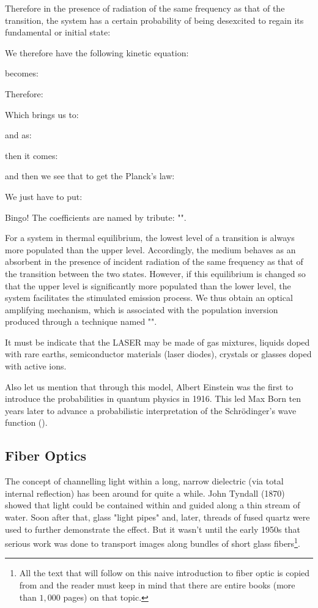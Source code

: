 	Therefore in the presence of radiation of the same frequency as that of the transition, the system has a certain probability of being desexcited to regain its fundamental or initial state:
		
	We therefore have the following kinetic equation:
	
	becomes:
	
	Therefore:
	
	Which brings us to:
	
	and as:
	
	then it comes:
	
	and then we see that to get the Planck's law:
	
	We just have to put:
	
	Bingo! The coefficients are named by tribute: "".
	
	For a system in thermal equilibrium, the lowest level of a transition is always more populated than the upper level. Accordingly, the medium behaves as an absorbent in the presence of incident radiation of the same frequency as that of the transition between the two states. However, if this equilibrium is changed so that the upper level is significantly more populated than the lower level, the system facilitates the stimulated emission process. We thus obtain an optical amplifying mechanism, which is associated with the population inversion produced through a technique named "".

	It must be indicate that the LASER may be made of gas mixtures, liquids doped with rare earths, semiconductor materials (laser diodes), crystals or glasses doped with active ions.

	Also let us mention that through this model, Albert Einstein was the first to introduce the probabilities in quantum physics in 1916. This led Max Born ten years later to advance a probabilistic interpretation of the Schrödinger's wave function ().
	
	\pagebreak
	\subsection{Fiber Optics}\label{fiber optics}
	The concept of channelling light within a long, narrow dielectric (via total internal reflection) has been around for quite a while. John Tyndall (1870) showed that light could be contained within and guided along a thin stream of water. Soon after that, glass "light pipes" and, later, threads of fused quartz were used to further demonstrate the effect. But it wasn't until the early 1950s that serious work was done to transport images along bundles of short glass fibers\footnote{All the text that will follow on this naive introduction to fiber optic is copied from \cite{hecht2016optics} and the reader must keep in mind that there are entire books (more than $1,000$ pages) on that topic.}.

